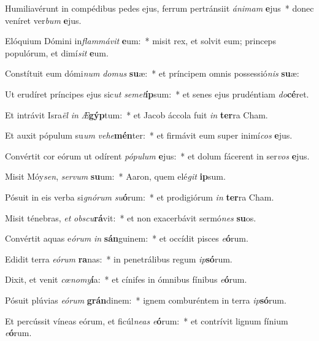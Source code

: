 \item Humiliavérunt in compédibus pedes ejus, ferrum pertránsiit \textit{á}\textit{ni}\textit{mam} \textbf{e}jus~* donec veníret ver\textit{bum} \textbf{e}jus.
\item Elóquium Dómini in\textit{flam}\textit{má}\textit{vit} \textbf{e}um:~* misit rex, et solvit eum; princeps populórum, et dimí\textit{sit} \textbf{e}um.
\item Constítuit eum dómi\textit{num} \textit{do}\textit{mus} \textbf{su}æ:~* et príncipem omnis possessió\textit{nis} \textbf{su}æ:
\item Ut erudíret príncipes ejus sic\textit{ut} \textit{se}\textit{met}\textbf{íp}sum:~* et senes ejus prudéntiam \textit{do}\textbf{cé}ret.
\item Et intrávit Isra\textit{ël} \textit{in} \textit{Æ}\textbf{gýp}tum:~* et Jacob áccola fuit \textit{in} \textbf{ter}ra Cham.
\item Et auxit pópulum su\textit{um} \textit{ve}\textit{he}\textbf{mén}ter:~* et firmávit eum super inimí\textit{cos} \textbf{e}jus.
\item Convértit cor eórum ut odírent \textit{pó}\textit{pu}\textit{lum} \textbf{e}jus:~* et dolum fácerent in ser\textit{vos} \textbf{e}jus.
\item Misit Móy\textit{sen}, \textit{ser}\textit{vum} \textbf{su}um:~* Aaron, quem elé\textit{git} \textbf{ip}sum.
\item Pósuit in eis verba si\textit{gnó}\textit{rum} \textit{su}\textbf{ó}rum:~* et prodigiórum \textit{in} \textbf{ter}ra Cham.
\item Misit ténebras, \textit{et} \textit{obs}\textit{cu}\textbf{rá}vit:~* et non exacerbávit sermó\textit{nes} \textbf{su}os.
\item Convértit aquas e\textit{ó}\textit{rum} \textit{in} \textbf{sán}guinem:~* et occídit pisces \textit{e}\textbf{ó}rum.
\item Edidit terra \textit{e}\textit{ó}\textit{rum} \textbf{ra}nas:~* in penetrálibus regum \textit{ip}\textbf{só}rum.
\item Dixit, et venit \textit{cœ}\textit{no}\textit{my}\textbf{í}a:~* et cínifes in ómnibus fínibus \textit{e}\textbf{ó}rum.
\item Pósuit plúvias \textit{e}\textit{ó}\textit{rum} \textbf{grán}dinem:~* ignem comburéntem in terra \textit{ip}\textbf{só}rum.
\item Et percússit víneas eórum, et ficúl\textit{ne}\textit{as} \textit{e}\textbf{ó}rum:~* et contrívit lignum fínium \textit{e}\textbf{ó}rum.
